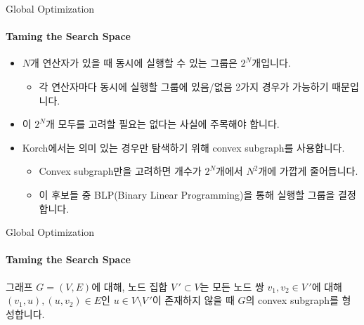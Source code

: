 \begin{frame}{Global Optimization}
\framesubtitle{Taming the Search Space}

\begin{itemize}
  \item \(N\)개 연산자가 있을 때 동시에 실행할 수 있는 그룹은 \(2^N\)개입니다.
  \begin{itemize}
    \item 각 연산자마다 동시에 실행할 그룹에 있음/없음 2가지 경우가 가능하기 때문입니다.
  \end{itemize}
  \pause
  \item 이 \(2^N\)개 모두를 고려할 필요는 없다는 사실에 주목해야 합니다.
\end{itemize}
\pause
\begin{figure}
  \centering
\end{figure}
\begin{itemize}
  \item Korch에서는 의미 있는 경우만 탐색하기 위해 convex subgraph를 사용합니다.
  \begin{itemize}
    \item Convex subgraph만을 고려하면 개수가 \(2^N\)개에서 \(N^2\)개에 가깝게 줄어듭니다.
    \item 이 후보들 중 BLP(Binary Linear Programming)을 통해 실행할 그룹을 결정합니다.
  \end{itemize}
\end{itemize}
\end{frame}

\begin{frame}{Global Optimization}
\framesubtitle{Taming the Search Space}

\begin{tcolorbox}[title={Convex subgraph의 정의}]
  그래프 \(G = (V, E)\)에 대해, 노드 집합 \(V\,'\subset V\)는 모든 노드 쌍 \(v_1, v_2 \in V\,'\)에 대해 \((v_1, u), (u, v_2) \in E\)인 \(u \in V \setminus V\,'\)이 존재하지 않을 때 \(G\)의 convex subgraph를 형성합니다.
\end{tcolorbox}
\end{frame}